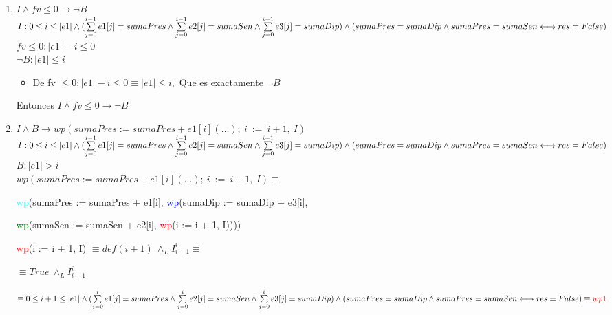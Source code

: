 \documentclass[10pt,a4paper]{article}
\begin{document}
\begin{enumerate}
\begin{enumerate}
\item $I \land fv \leq 0 \longrightarrow \neg{B}$ \\
$I : 0 \leq i \leq |e1| \land (\sum\limits_{j=0}^{i - 1} e1[j] = sumaPres \land \sum\limits_{j=0}^{i - 1} e2[j] = sumaSen \land \sum\limits_{j=0}^{i - 1} e3[j] = sumaDip) \land \\
    (sumaPres = sumaDip  \land sumaPres = sumaSen \longleftrightarrow res = False)$ \\
    
$fv \leq 0 : |e1| - i  \leq 0$ \\
$\neg{B} : |e1| \leq i$
\begin{itemize}
    \item De fv $\leq 0: |e1| - i \leq 0 \equiv |e1| \leq i,$ 
    Que es exactamente $\neg{B}$
\end{itemize}

Entonces $I \land fv \leq 0 \longrightarrow \neg{B}$

\item $I \land B \longrightarrow wp(sumaPres := sumaPres + e1[i](\ldots);\: i \: := \: i + 1, \: I)$\\
$I : 0 \leq i \leq |e1| \land (\sum\limits_{j=0}^{i - 1} e1[j] = sumaPres \land \sum\limits_{j=0}^{i - 1} e2[j] = sumaSen \land \sum\limits_{j=0}^{i - 1} e3[j] = sumaDip) \land \\
    (sumaPres = sumaDip  \land sumaPres = sumaSen \longleftrightarrow res = False)$ \\
$B : |e1| > i$ \\
$wp(sumaPres := sumaPres + e1[i](\ldots);\: i \: := \: i + 1, \: I) \equiv$ 

\quad\quad \textcolor{cyan}{wp}(sumaPres := sumaPres + e1[i], \textcolor{blue}{wp}(sumaDip := sumaDip + e3[i],

\quad\quad \textcolor{green}{wp}(sumaSen := sumaSen + e2[i], \textcolor{red}{wp}(i := i + 1, I))))

\quad\quad\quad \textcolor{red}{wp}(i := i + 1, I) $\equiv def(i+1) \: \land_{L} I^i_{i+1} \equiv$

\quad\quad\quad $\equiv True \: \land_{L} I^i_{i+1}$

\quad\quad\quad $\equiv 0 \leq i + 1 \leq |e1| \land (\sum\limits_{j=0}^{i} e1[j] = sumaPres \land \sum\limits_{j=0}^{i} e2[j] = sumaSen \land \sum\limits_{j=0}^{i} e3[j] = sumaDip) \land \\
    (sumaPres = sumaDip  \land sumaPres = sumaSen \longleftrightarrow res = False) \equiv \textcolor{red}{wp1} $\\


\end{enumerate}
\end{enumerate}
\end{document}
